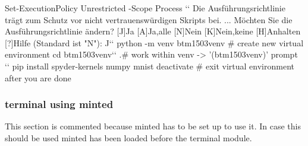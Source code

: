 \documentclass[
]{bfhpub}				%
\begin{document}

\begin{ubuntu}
Set-ExecutionPolicy Unrestricted -Scope Process `\StartConsole`
Die Ausführungsrichtlinie trägt zum Schutz vor nicht vertrauenswürdigen Skripts bei. ... Möchten Sie die Ausführungsrichtlinie ändern?
[J]Ja  [A]Ja,alle  [N]Nein  [K]Nein,keine  [H]Anhalten  [?]Hilfe
(Standard ist "N"): J``
python -m venv btm1503venv # create new virtual environment
cd btm1503venv``
.\Scripts\activate # work within venv -> '(btm1503venv)' prompt ``
pip install spyder-kernels numpy mnist
deactivate # exit virtual environment after you are done
\end{ubuntu}


\subsubsection{terminal using minted}

This section is commented because minted has to be set up to use it.
In case this should be used minted has been loaded before the terminal module.

%
\end{document}
